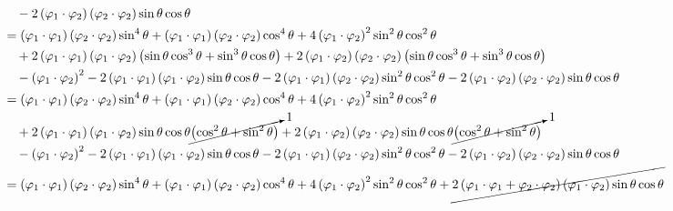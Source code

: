 \documentclass[11pt]{article}
\begin{document}
\begin{align*}
    & \quad - 2 \left( \varphi_1\cdot\varphi_2 \right) \left( \varphi_2\cdot\varphi_2 \right) \sin \theta \cos \theta \\
    &= \left( \varphi_1\cdot\varphi_1 \right) \left( \varphi_2\cdot\varphi_2 \right) \sin^4 \theta + \left( \varphi_1\cdot\varphi_1 \right) \left( \varphi_2\cdot\varphi_2 \right) \cos^4 \theta + 4 \left( \varphi_1\cdot\varphi_2 \right)^2 \sin^2 \theta \cos^2 \theta \\
    & \quad + 2 \left( \varphi_1\cdot\varphi_1 \right) \left( \varphi_1\cdot\varphi_2 \right) \left( \sin \theta \cos^3 \theta + \sin^3 \theta \cos \theta \right) + 2 \left( \varphi_1\cdot\varphi_2 \right) \left( \varphi_2\cdot\varphi_2 \right) \left( \sin \theta \cos^3 \theta + \sin^3 \theta \cos \theta \right) \\
    & \quad  - \left( \varphi_1\cdot\varphi_2 \right)^2 - 2 \left( \varphi_1\cdot\varphi_1 \right) \left( \varphi_1\cdot\varphi_2 \right) \sin \theta \cos \theta - 2 \left( \varphi_1\cdot\varphi_1 \right) \left( \varphi_2\cdot\varphi_2 \right) \sin^2 \theta \cos^2 \theta - 2 \left( \varphi_1\cdot\varphi_2 \right) \left( \varphi_2\cdot\varphi_2 \right) \sin \theta \cos \theta \\
    &= \left( \varphi_1\cdot\varphi_1 \right) \left( \varphi_2\cdot\varphi_2 \right) \sin^4 \theta + \left( \varphi_1\cdot\varphi_1 \right) \left( \varphi_2\cdot\varphi_2 \right) \cos^4 \theta + 4 \left( \varphi_1\cdot\varphi_2 \right)^2 \sin^2 \theta \cos^2 \theta \\
    & \quad + 2 \left( \varphi_1\cdot\varphi_1 \right) \left( \varphi_1\cdot\varphi_2 \right) \sin \theta \cos \theta \cancelto{1}{\left( \cos^2 \theta + \sin^2 \theta \right)} + 2 \left( \varphi_1\cdot\varphi_2 \right) \left( \varphi_2\cdot\varphi_2 \right) \sin \theta \cos \theta \cancelto{1}{\left( \cos^2 \theta + \sin^2 \theta \right)} \\
    & \quad  - \left( \varphi_1\cdot\varphi_2 \right)^2 - 2 \left( \varphi_1\cdot\varphi_1 \right) \left( \varphi_1\cdot\varphi_2 \right) \sin \theta \cos \theta - 2 \left( \varphi_1\cdot\varphi_1 \right) \left( \varphi_2\cdot\varphi_2 \right) \sin^2 \theta \cos^2 \theta - 2 \left( \varphi_1\cdot\varphi_2 \right) \left( \varphi_2\cdot\varphi_2 \right) \sin \theta \cos \theta \\
    &= \left( \varphi_1\cdot\varphi_1 \right) \left( \varphi_2\cdot\varphi_2 \right) \sin^4 \theta + \left( \varphi_1\cdot\varphi_1 \right) \left( \varphi_2\cdot\varphi_2 \right) \cos^4 \theta + 4 \left( \varphi_1\cdot\varphi_2 \right)^2 \sin^2 \theta \cos^2 \theta + \cancel{2 \left( \varphi_1\cdot\varphi_1 + \varphi_2\cdot\varphi_2 \right) \left( \varphi_1\cdot\varphi_2 \right) \sin \theta \cos \theta} \\

\end{align*}
\end{document}
